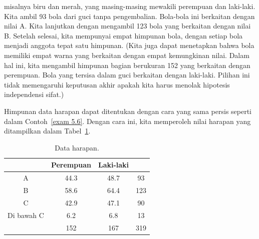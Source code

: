 \begin{example}
misalnya biru dan merah, yang masing-masing mewakili perempuan dan laki-laki.  Kita
ambil 93 bola dari guci tanpa pengembalian.  Bola-bola ini berkaitan dengan nilai A.
Kita lanjutkan dengan mengambil 123 bola yang berkaitan dengan nilai B.  Setelah
selesai, kita mempunyai empat himpunan bola, dengan setiap bola menjadi anggota tepat
satu himpunan.  (Kita juga dapat menetapkan bahwa bola memiliki empat warna yang
berkaitan dengan empat kemungkinan nilai.  Dalam hal ini, kita mengambil himpunan
bagian berukuran 152 yang berkaitan dengan perempuan.  Bola yang tersisa dalam guci
berkaitan dengan laki-laki.  Pilihan ini tidak memengaruhi keputusan akhir apakah
kita harus menolak hipotesis independensi sifat.)
\par
Himpunan data harapan dapat ditentukan dengan cara yang sama persis seperti dalam
Contoh~\ref{exam 5.6}.  Dengan cara ini, kita memperoleh nilai harapan yang
ditampilkan dalam Tabel~\ref{table 5.8}.
\begin{table}
\centering
\begin{tabular}{|c|c|c|c|}
\hline
       & Perempuan \hspace{.15in}&\hspace{.15in}Laki-laki\hspace{.15in}&         \\ \hline 
A      & \hspace{.15in}44.3     & \hspace{.15in}48.7  &\hspace{.15in}93  \\ \hline 
B      & \hspace{.15in}58.6     & \hspace{.15in}64.4  &\hspace{.075in}123\\ \hline 
C      & \hspace{.15in}42.9     & \hspace{.15in}47.1  &\hspace{.15in}90  \\ \hline 
Di bawah C& \hspace{.15in}6.2     & \hspace{.2in}6.8    &\hspace{.15in}13  \\ \hline 
       &  152                   &  167                &\hspace{.075in}319\\ 
\hline
\end{tabular}
\caption{Data harapan.}
\label{table 5.8}
\end{table}

\end{example}

